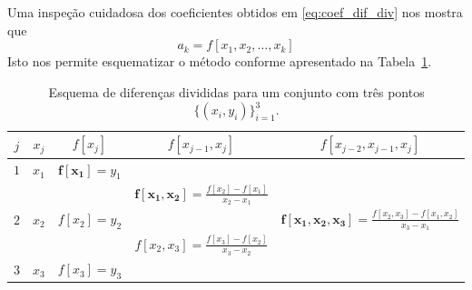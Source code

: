 Uma inspeção cuidadosa dos coeficientes obtidos em \eqref{eq:coef_dif_div} nos mostra que
\begin{equation*}
 a_k=f[x_1,x_2,\ldots,x_k]
\end{equation*}
Isto nos permite esquematizar o método conforme apresentado na Tabela~\ref{tab:esquema_difdiv}.

\begin{table}
  \centering
  \caption{Esquema de diferenças divididas para um conjunto com três pontos $\{(x_i, y_i)\}_{i=1}^3$.}
  \label{tab:esquema_difdiv}
\begin{tabular}{c||c|ccc}\hline
$j$ & $x_j$ & $f[x_j]$ & $f[x_{j-1},x_j]$ & $f[x_{j-2},x_{j-1},x_j]$ \\\hline
$1$ & $x_1$ & $\pmb{f[x_1]}=y_1$ & &\\
&&&$\displaystyle \pmb{f[x_1,x_2]}=\frac{f[x_2]-f[x_1]}{x_2-x_1}$&\\
$2$ & $x_2$ & $f[x_2] = y_2$ && $\displaystyle \pmb{f[x_1,x_2,x_3]}=\frac{f[x_2,x_3]-f[x_1,x_2]}{x_3-x_1}$\\
&&&$\displaystyle f[x_2,x_3]=\frac{f[x_3]-f[x_2]}{x_3-x_2}$ &\\
$3$ & $x_3$ & $f[x_3]=y_3$ &&\\\hline
\end{tabular}
\end{table}

